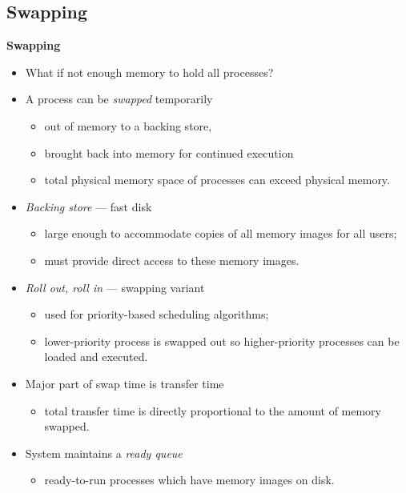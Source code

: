 \documentclass[11pt,a4paper]{article}
\begin{document}
\subsection{Swapping}

\textbf{Swapping}
\begin{itemize}
    \item What if not enough memory to hold all processes?
    \item A process can be \emph{swapped} temporarily
        \begin{itemize}
            \item out of memory to a backing store,
            \item brought back into memory for continued execution
            \item total physical memory space of processes can exceed physical memory.
        \end{itemize}
    \item \emph{Backing store} --- fast disk
        \begin{itemize}
            \item large enough to accommodate copies of all memory images for all users;
            \item must provide direct access to these memory images.
        \end{itemize}
    \item \emph{Roll out, roll in} --- swapping variant
        \begin{itemize}
            \item used for priority-based scheduling algorithms;
            \item lower-priority process is swapped out so higher-priority processes
                can be loaded and executed.
        \end{itemize}
    \item Major part of swap time is transfer time
        \begin{itemize}
            \item total transfer time is directly proportional to the amount of memory swapped.
        \end{itemize}
    \item System maintains a \emph{ready queue}
        \begin{itemize}
            \item ready-to-run processes which have memory images on disk.
        \end{itemize}
\end{itemize}
\end{document}
